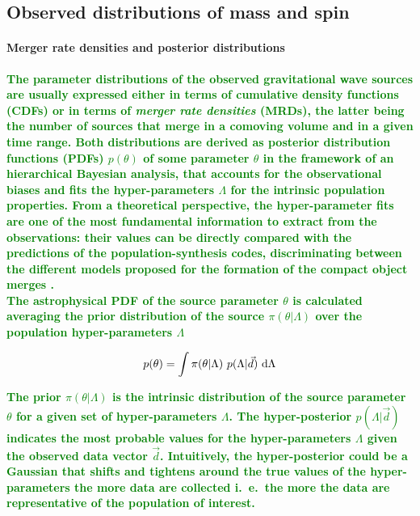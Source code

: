 \documentclass[a4paper,titlepage]{book}     	%
\newcommand{\erika}[1]{\textcolor{green}{\bf#1}}
\begin{document}
\subsection{Observed distributions of mass and spin}\label{subsec:GWmassspin}

\paragraph{Merger rate densities and posterior distributions}%
\erika{The parameter distributions of the observed gravitational wave sources are usually expressed either in terms of cumulative density functions (CDFs) or in terms of \emph{merger rate densities} (MRDs), the latter being the number of sources that merge in a comoving volume and in a given time range. Both distributions are derived as posterior distribution functions (PDFs) $p(\theta)$ of some parameter $\theta$ in the framework of an hierarchical Bayesian analysis, that accounts for the observational biases and fits the hyper-parameters $\Lambda$ for the intrinsic population properties. From a theoretical perspective, the hyper-parameter fits are one of the most fundamental information to extract from the observations: their values can be directly compared with the predictions of the population-synthesis codes, discriminating between the different models proposed for the formation of the compact object merges \cite{GWTC-3_interpretation, BayesforGW}.} \\

\erika{The astrophysical PDF of the source parameter $\theta$ is calculated averaging the prior distribution of the source $\pi(\theta|\Lambda)$ over the population hyper-parameters $\Lambda$ }

\begin{equation}\label{eq:posteriorMRD}
    p(\theta) = \int \pi(\theta|\Lambda)~p(\Lambda|\vec{d})~\rm d \Lambda
\end{equation}

\erika{The prior $\pi(\theta|\Lambda)$ is the intrinsic distribution of the source parameter $\theta$ for a given set of hyper-parameters $\Lambda$. The hyper-posterior $p(\Lambda|\vec{d})$ indicates the most probable values for the hyper-parameters $\Lambda$ given the observed data vector $\vec{d}$. Intuitively, the hyper-posterior could be a Gaussian that shifts and tightens around the true values of the hyper-parameters the more data are collected i.\ e.\ the more the data are representative of the population of interest.}
\end{document}
